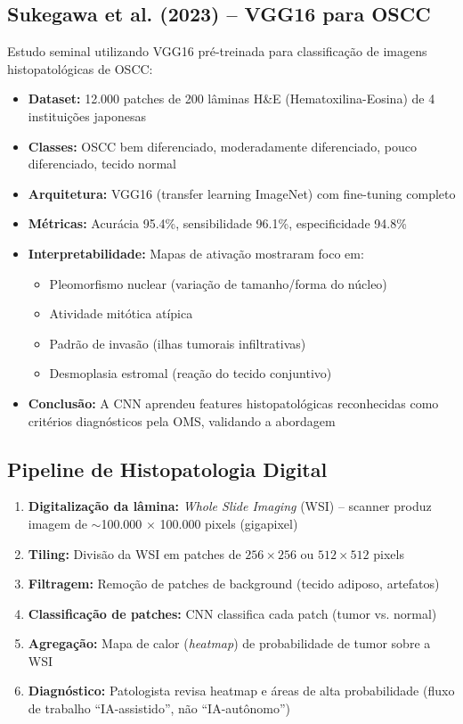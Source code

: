 \subsection{Sukegawa et al. (2023) -- VGG16 para OSCC}

Estudo seminal utilizando VGG16 pré-treinada para classificação de imagens
histopatológicas de OSCC:

\begin{itemize}
  \item \textbf{Dataset:} 12.000 patches de 200 lâminas H\&E (Hematoxilina-Eosina)
        de 4 instituições japonesas
  \item \textbf{Classes:} OSCC bem diferenciado, moderadamente diferenciado,
        pouco diferenciado, tecido normal
  \item \textbf{Arquitetura:} VGG16 (transfer learning ImageNet) com
        fine-tuning completo
  \item \textbf{Métricas:} Acurácia 95.4\%, sensibilidade 96.1\%, especificidade 94.8\%
  \item \textbf{Interpretabilidade:} Mapas de ativação mostraram foco em:
        \begin{itemize}
          \item Pleomorfismo nuclear (variação de tamanho/forma do núcleo)
          \item Atividade mitótica atípica
          \item Padrão de invasão (ilhas tumorais infiltrativas)
          \item Desmoplasia estromal (reação do tecido conjuntivo)
        \end{itemize}
  \item \textbf{Conclusão:} A CNN aprendeu features histopatológicas reconhecidas
        como critérios diagnósticos pela OMS, validando a abordagem
\end{itemize}

\subsection{Pipeline de Histopatologia Digital}

\begin{enumerate}
  \item \textbf{Digitalização da lâmina:} \textit{Whole Slide Imaging} (WSI) --
        scanner produz imagem de $\sim$100.000 $\times$ 100.000 pixels (gigapixel)
  \item \textbf{Tiling:} Divisão da WSI em patches de $256 \times 256$ ou
        $512 \times 512$ pixels
  \item \textbf{Filtragem:} Remoção de patches de background (tecido adiposo, artefatos)
  \item \textbf{Classificação de patches:} CNN classifica cada patch (tumor vs. normal)
  \item \textbf{Agregação:} Mapa de calor (\textit{heatmap}) de probabilidade de
        tumor sobre a WSI
  \item \textbf{Diagnóstico:} Patologista revisa heatmap e áreas de alta probabilidade
        (fluxo de trabalho ``IA-assistido'', não ``IA-autônomo'')
\end{enumerate}

